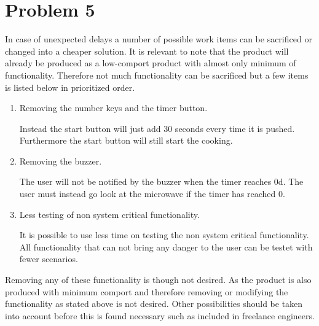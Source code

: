 \chapter{Problem 5}

In case of unexpected delays a number of possible work items can be sacrificed or changed into a cheaper solution. It is relevant to note that the product will already be produced as a low-comport product with almost only minimum of functionality. Therefore not much functionality can be sacrificed but a few items is listed below in prioritized order. 

\begin{enumerate}
\item Removing the number keys and the timer button. 

Instead the start button will just add 30 seconds every time it is pushed. Furthermore the start button will still start the cooking.
	
\item Removing the buzzer. 

The user will not be notified by the buzzer when the timer reaches 0d. The user must instead go look at the microwave if the timer has reached 0.

\item Less testing of non system critical functionality.

It is possible to use less time on testing the non system critical functionality. All functionality that can not bring any danger to the user can be testet with fewer scenarios.

\end{enumerate}

Removing any of these functionality is though not desired. As the product is also produced with minimum comport and therefore removing or modifying the functionality as stated above is not desired. Other possibilities should be taken into account before this is found necessary such as included in freelance engineers.


